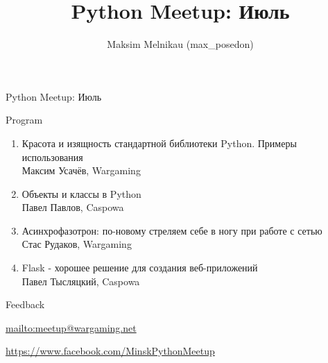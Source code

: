 \documentclass[aspectratio=169]{beamer}
\begin{document}
\title{Python Meetup: Июль}
\author{Maksim Melnikau (max\_posedon)}
\date{}

\begin{frame}{Python Meetup: Июль}
    \begin{block}{Program}
    \begin{enumerate}
        \item Красота и изящность стандартной библиотеки Python. Примеры использования\\Максим Усачёв, Wargaming
        \item Объекты и классы в Python\\Павел Павлов, Caspowa
        \item Асинхрофазотрон: по-новому стреляем себе в ногу при работе с сетью\\Стас Рудаков, Wargaming
        \item Flask - хорошее решение для создания веб-приложений\\Павел Тысляцкий, Caspowa
    \end{enumerate}
    \end{block}

    \begin{block}{Feedback}
    \par \url{mailto:meetup@wargaming.net}
    \par \url{https://www.facebook.com/MinskPythonMeetup}
    \end{block}
\end{frame}
\end{document}
